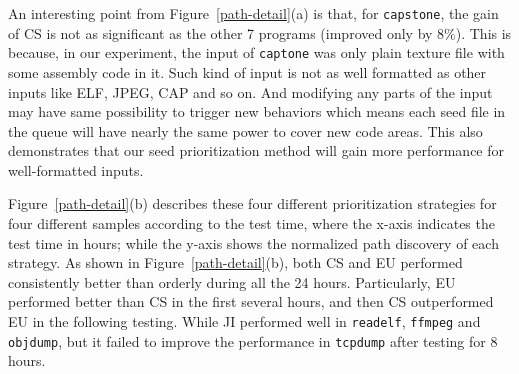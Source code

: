 An interesting point from Figure~\ref{path-detail}(a) is that, for \texttt{capstone}, the gain of CS is not as significant as the other 7 programs (improved only by 8\%). This is because, in our experiment, the input of \texttt{captone} was only plain texture file with some assembly code in it. Such kind of input is not as well formatted as other inputs like ELF, JPEG, CAP and so on. And modifying any parts of the input may have same possibility to trigger new behaviors which means each seed file in the queue will have nearly the same power to cover new code areas. This also demonstrates that our seed prioritization method will gain more performance for well-formatted inputs.

Figure~\ref{path-detail}(b) describes these four different prioritization strategies for four different samples according to the test time, where the x-axis indicates the test time in hours; while the y-axis shows the normalized path discovery of each strategy.
As shown in Figure~\ref{path-detail}(b), both CS and EU performed consistently better than orderly during all the 24 hours. Particularly, EU performed better than CS in the first several hours, and then CS outperformed EU in the following testing. While JI performed well in \texttt{readelf}, \texttt{ffmpeg} and \texttt{objdump}, but it failed to improve the performance in \texttt{tcpdump} after testing for 8 hours.

